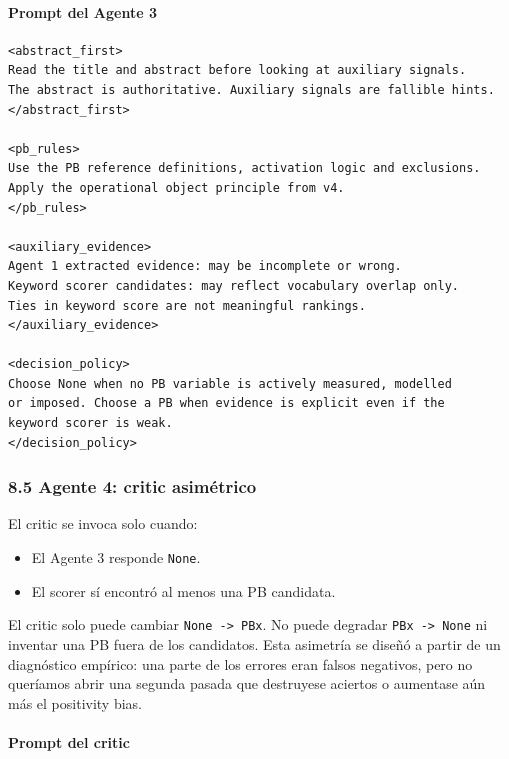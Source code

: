 \paragraph{Prompt del Agente 3}

{\footnotesize
\begin{verbatim}
<abstract_first>
Read the title and abstract before looking at auxiliary signals.
The abstract is authoritative. Auxiliary signals are fallible hints.
</abstract_first>

<pb_rules>
Use the PB reference definitions, activation logic and exclusions.
Apply the operational object principle from v4.
</pb_rules>

<auxiliary_evidence>
Agent 1 extracted evidence: may be incomplete or wrong.
Keyword scorer candidates: may reflect vocabulary overlap only.
Ties in keyword score are not meaningful rankings.
</auxiliary_evidence>

<decision_policy>
Choose None when no PB variable is actively measured, modelled
or imposed. Choose a PB when evidence is explicit even if the
keyword scorer is weak.
</decision_policy>
\end{verbatim}
}

\subsubsection{8.5 Agente 4: critic asimétrico}

El critic se invoca solo cuando:

\begin{itemize}
\item El Agente 3 responde \texttt{None}.
\item El scorer sí encontró al menos una PB candidata.
\end{itemize}

El critic solo puede cambiar \texttt{None -> PBx}. No puede degradar \texttt{PBx -> None} ni inventar una PB fuera de los candidatos. Esta asimetría se diseñó a partir de un diagnóstico empírico: una parte de los errores eran falsos negativos, pero no queríamos abrir una segunda pasada que destruyese aciertos o aumentase aún más el positivity bias.

\paragraph{Prompt del critic}

